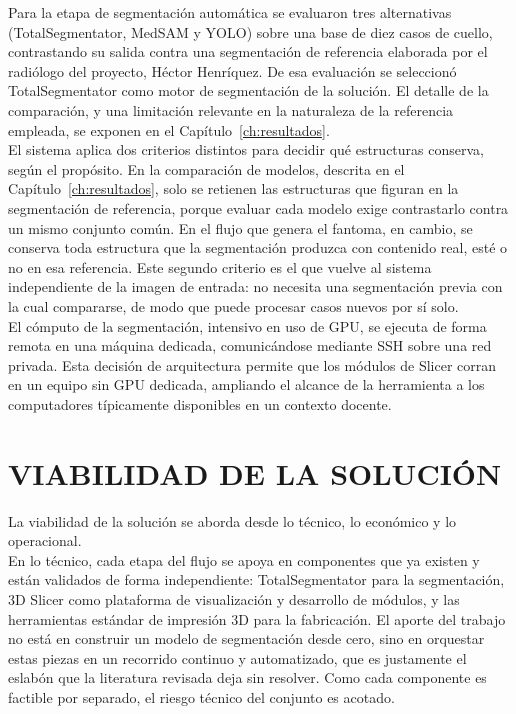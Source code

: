 Para la etapa de segmentación automática se evaluaron tres alternativas (TotalSegmentator, MedSAM y YOLO) sobre una base de diez casos de cuello, contrastando su salida contra una segmentación de referencia elaborada por el radiólogo del proyecto, Héctor Henríquez. De esa evaluación se seleccionó TotalSegmentator \citep{wasserthal2023totalsegmentator} como motor de segmentación de la solución. El detalle de la comparación, y una limitación relevante en la naturaleza de la referencia empleada, se exponen en el Capítulo~\ref{ch:resultados}.\\

El sistema aplica dos criterios distintos para decidir qué estructuras conserva, según el propósito. En la comparación de modelos, descrita en el Capítulo~\ref{ch:resultados}, solo se retienen las estructuras que figuran en la segmentación de referencia, porque evaluar cada modelo exige contrastarlo contra un mismo conjunto común. En el flujo que genera el fantoma, en cambio, se conserva toda estructura que la segmentación produzca con contenido real, esté o no en esa referencia. Este segundo criterio es el que vuelve al sistema independiente de la imagen de entrada: no necesita una segmentación previa con la cual compararse, de modo que puede procesar casos nuevos por sí solo.\\

El cómputo de la segmentación, intensivo en uso de GPU, se ejecuta de forma remota en una máquina dedicada, comunicándose mediante SSH sobre una red privada. Esta decisión de arquitectura permite que los módulos de Slicer corran en un equipo sin GPU dedicada, ampliando el alcance de la herramienta a los computadores típicamente disponibles en un contexto docente.\\

\section{VIABILIDAD DE LA SOLUCIÓN}

La viabilidad de la solución se aborda desde lo técnico, lo económico y lo operacional.\\

En lo técnico, cada etapa del flujo se apoya en componentes que ya existen y están validados de forma independiente: TotalSegmentator para la segmentación, 3D Slicer como plataforma de visualización y desarrollo de módulos, y las herramientas estándar de impresión 3D para la fabricación. El aporte del trabajo no está en construir un modelo de segmentación desde cero, sino en orquestar estas piezas en un recorrido continuo y automatizado, que es justamente el eslabón que la literatura revisada deja sin resolver. Como cada componente es factible por separado, el riesgo técnico del conjunto es acotado.\\

